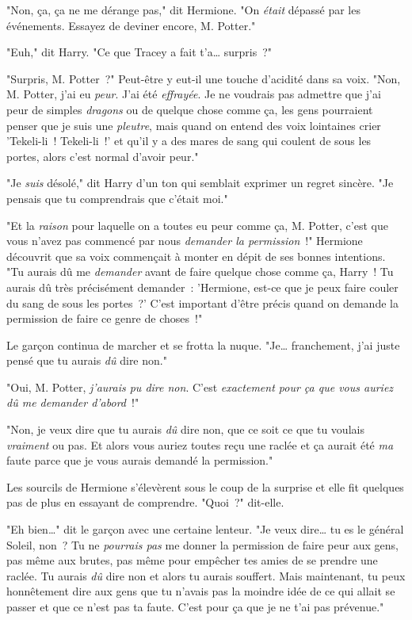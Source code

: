"Non, ça, ça ne me dérange pas," dit Hermione. "On \emph{était} dépassé par les événements. Essayez de deviner encore, M. Potter."

"Euh," dit Harry. "Ce que Tracey a fait t'a… surpris~?"

"Surpris, M. Potter~?" Peut-être y eut-il une touche d'acidité dans sa voix. "Non, M. Potter, j'ai eu \emph{peur}. J'ai été \emph{effrayée}. Je ne voudrais pas admettre que j'ai peur de simples \emph{dragons} ou de quelque chose comme ça, les gens pourraient penser que je suis une \emph{pleutre}, mais quand on entend des voix lointaines crier 'Tekeli-li~! Tekeli-li~!' et qu'il y a des mares de sang qui coulent de sous les portes, alors c'est normal d'avoir peur."

"Je \emph{suis} désolé," dit Harry d'un ton qui semblait exprimer un regret sincère. "Je pensais que tu comprendrais que c'était moi."

"Et la \emph{raison} pour laquelle on a toutes eu peur comme ça, M. Potter, c'est que vous n'avez pas commencé par nous \emph{demander la permission}~!" Hermione découvrit que sa voix commençait à monter en dépit de ses bonnes intentions. "Tu aurais dû me \emph{demander} avant de faire quelque chose comme ça, Harry~! Tu aurais dû très précisément demander~: 'Hermione, est-ce que je peux faire couler du sang de sous les portes~?' C'est important d'être précis quand on demande la permission de faire ce genre de choses~!"

Le garçon continua de marcher et se frotta la nuque. "Je… franchement, j'ai juste pensé que tu aurais \emph{dû} dire non."

"Oui, M. Potter, \emph{j'aurais pu dire non}. C'est \emph{exactement pour ça que vous auriez dû me demander d'abord}~!"

"Non, je veux dire que tu aurais \emph{dû} dire non, que ce soit ce que tu voulais \emph{vraiment} ou pas. Et alors vous auriez toutes reçu une raclée et ça aurait été \emph{ma} faute parce que je vous aurais demandé la permission."

Les sourcils de Hermione s'élevèrent sous le coup de la surprise et elle fit quelques pas de plus en essayant de comprendre. "Quoi~?" dit-elle.

"Eh bien…" dit le garçon avec une certaine lenteur. "Je veux dire… tu es le général Soleil, non~? Tu ne \emph{pourrais pas} me donner la permission de faire peur aux gens, pas même aux brutes, pas même pour empêcher tes amies de se prendre une raclée. Tu aurais \emph{dû} dire non et alors tu aurais souffert. Mais maintenant, tu peux honnêtement dire aux gens que tu n'avais pas la moindre idée de ce qui allait se passer et que ce n'est pas ta faute. C'est pour ça que je ne t'ai pas prévenue."

